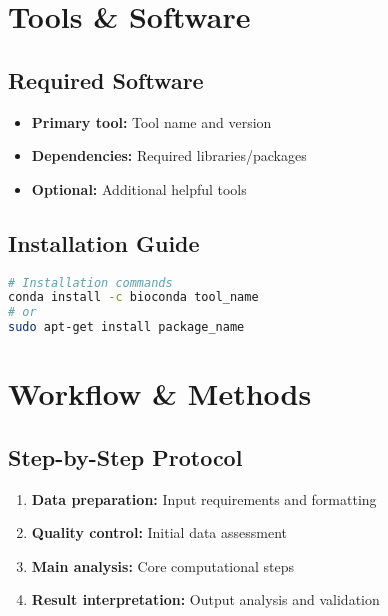\documentclass[a4paper,11pt]{article}
\begin{document}
\section{}


\section{Tools \& Software}

\subsection{Required Software}

\begin{itemize}
    \item \textbf{Primary tool:} Tool name and version
    \item \textbf{Dependencies:} Required libraries/packages
    \item \textbf{Optional:} Additional helpful tools
\end{itemize}

\subsection{Installation Guide}
\begin{lstlisting}[language=bash, caption=Software installation]
# Installation commands
conda install -c bioconda tool_name
# or
sudo apt-get install package_name
\end{lstlisting}

\section{Workflow \& Methods}

\subsection{Step-by-Step Protocol}

\begin{enumerate}
    \item \textbf{Data preparation:} Input requirements and formatting
    \item \textbf{Quality control:} Initial data assessment
    \item \textbf{Main analysis:} Core computational steps
    \item \textbf{Result interpretation:} Output analysis and validation
\end{enumerate}
\end{document}
